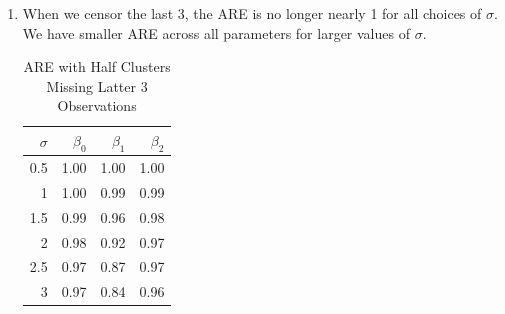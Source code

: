 \documentclass[11pt]{article}
\begin{document}
\begin{enumerate}
\begin{enumerate}
			\item When we censor the last 3, the ARE is no longer nearly 1 for all choices of $\sigma$. We have smaller ARE across all parameters for larger values of $\sigma$. 
				\begin{table}[H]
				\centering
				\begin{tabular}{|r||r|r|r|}
 				 \hline
				 $\sigma$ & $\beta_0$ & $\beta_1$ & $\beta_2$ \\ 
 				 \hline
 				 \hline
				0.5& 1.00 & 1.00 & 1.00 \\ 
				  1 & 1.00 & 0.99 & 0.99 \\ 
				  1.5 & 0.99 & 0.96 & 0.98 \\ 
				  2 & 0.98 & 0.92 & 0.97 \\ 
				  2.5 & 0.97 & 0.87 & 0.97 \\ 
				  3 & 0.97 & 0.84 & 0.96 \\ 
				   \hline
			\end{tabular}
			\caption{ARE with Half Clusters Missing Latter 3 Observations}
			\end{table}
		\end{enumerate}
	

\end{enumerate}
\end{document}
